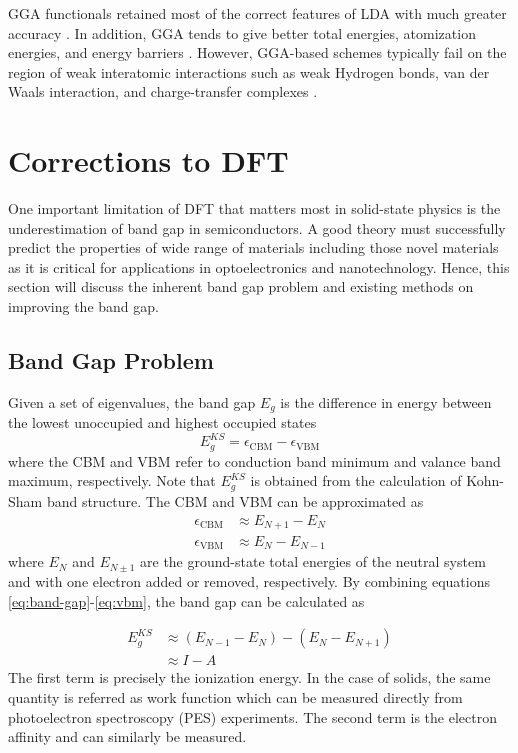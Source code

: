 GGA functionals retained most of the correct features of LDA with much greater accuracy \citep{Burke1997}. In addition, GGA tends to give better total energies, atomization energies, and energy barriers \citep{Becke1988,Langreth1983,Perdew1992a,Proynov1995}. However, GGA-based schemes typically fail on the region of weak interatomic interactions such as weak Hydrogen bonds, van der Waals interaction, and charge-transfer complexes \citep{Kim1994,PerezJorda1995,Ruiz1995}.

\section{Corrections to DFT}
One important limitation of DFT that matters most in solid-state physics is the underestimation of band gap in semiconductors. A good theory must successfully predict the  properties of wide range of materials including those novel materials as it is critical for applications in optoelectronics and nanotechnology. Hence, this section will discuss the inherent band gap problem and existing methods on improving the band gap.

\subsection{Band Gap Problem}
Given a set of eigenvalues, the band gap $E_g$ is the difference in energy between the lowest unoccupied and highest occupied states
\begin{equation} \label{eq:band-gap}
	E_g^{KS} = \epsilon_{\text{CBM}} - \epsilon_{\text{VBM}}
\end{equation}
where the CBM and VBM refer to conduction band minimum and valance band maximum, respectively. Note that $E_g^{KS}$ is obtained from the calculation of Kohn-Sham band structure. The CBM and VBM can be approximated as
\begin{align}
	\epsilon_{\text{CBM}} & \approx E_{N + 1} - E_{N} \label{eq:cbm} \\
	\epsilon_{\text{VBM}} & \approx E_{N} - E_{N - 1}	\label{eq:vbm}
\end{align}
where $E_{N}$ and $E_{N \pm 1}$ are the ground-state total energies of the neutral system and with one electron added or removed, respectively. By combining equations \eqref{eq:band-gap}-\eqref{eq:vbm}, the band gap can be calculated as \citep{MoriSanchez2008}

\begin{align} \label{eq:band-gap1}
	E_g^{KS} & \approx (E_{N - 1} - E_{N} )  - (E_{N} - E_{N + 1}) \\
	         & \approx I - A \nonumber
\end{align}
The first term is precisely the ionization energy. In the case of solids, the same quantity is referred as work function which can be measured directly from photoelectron spectroscopy (PES) experiments. The second term is the electron affinity and can similarly be measured.

